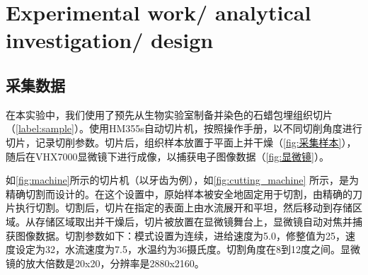 \section{Experimental work/ analytical investigation/ design}


\subsection{采集数据}
在本实验中，我们使用了预先从生物实验室制备并染色的石蜡包埋组织切片（\autoref{label:sample}）。使用HM355s自动切片机，按照操作手册，以不同切削角度进行切片，记录切削参数。切片后，组织样本放置于平面上并干燥（\autoref{fig:采集样本}），随后在VHX7000显微镜下进行成像，以捕获电子图像数据（\autoref{fig:显微镜}）。

如\autoref{fig:machine}所示的切片机（以牙齿为例），如\autoref{fig:cutting_machine} \cite{4.1}所示，是为精确切割而设计的。在这个设置中，原始样本被安全地固定用于切割，由精确的刀片执行切割。切割后，切片在指定的表面上由水流展开和平坦，然后移动到存储区域。从存储区域取出并干燥后，切片被放置在显微镜舞台上，显微镜自动对焦并捕获图像数据。切割参数如下：模式设置为连续，进给速度为5.0，修整值为25，速度设定为32，水流速度为7.5，水温约为36摄氏度。切割角度在8到12度之间。显微镜的放大倍数是20x20，分辨率是2880x2160。



